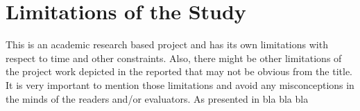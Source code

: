 \section{Limitations of the Study}
This is an academic research based project and has its own limitations with respect to time and other constraints. Also, there might be other limitations of the project work depicted in the reported that may not be obvious from the title. It is very important to mention those limitations and avoid any misconceptions in the minds of the readers and/or evaluators. As presented in \cite{abcd} bla bla bla



